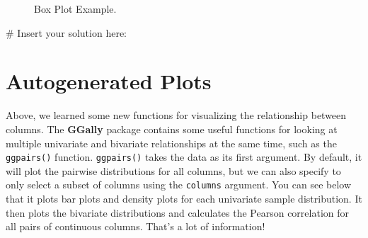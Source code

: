 \documentclass[
  letterpaper,
]{krantz}
\makeatletter
\newenvironment{Shaded}{\begin{snugshade}}{\end{snugshade}}
\newcommand{\CommentTok}[1]{\textcolor[rgb]{0.37,0.37,0.37}{#1}}
\newenvironment{kframe}{%
\medskip{}
\setlength{\fboxsep}{.8em}
 \def\at@end@of@kframe{}%
 \ifinner\ifhmode%
  \def\at@end@of@kframe{\end{minipage}}%
  \begin{minipage}{\columnwidth}%
 \fi\fi%
 \def\FrameCommand##1{\hskip\@totalleftmargin \hskip-\fboxsep
 \colorbox{shadecolor}{##1}\hskip-\fboxsep
     \hskip-\linewidth \hskip-\@totalleftmargin \hskip\columnwidth}%
 \MakeFramed {\advance\hsize-\width
   \@totalleftmargin\z@ \linewidth\hsize
   \@setminipage}}%
 {\par\unskip\endMakeFramed%
 \at@end@of@kframe}
\renewenvironment{Shaded}{\begin{kframe}}{\end{kframe}}
\makeatother
\begin{document}
\begin{figure}


\caption{\label{fig-box-plot}Box Plot Example.}

\end{figure}%

\begin{Shaded}
\begin{Highlighting}[]
\CommentTok{\# Insert your solution here:}
\end{Highlighting}
\end{Shaded}

\section{Autogenerated Plots}\label{autogenerated-plots}

Above, we learned some new functions for visualizing the relationship
between columns. The \textbf{GGally} package contains some useful
functions for looking at multiple univariate and bivariate relationships
at the same time, such as the \texttt{ggpairs()} function.
\texttt{ggpairs()} takes the data as its first argument. By default, it
will plot the pairwise distributions for all columns, but we can also
specify to only select a subset of columns using the \texttt{columns}
argument. You can see below that it plots bar plots and density plots
for each univariate sample distribution. It then plots the bivariate
distributions and calculates the Pearson correlation for all pairs of
continuous columns. That's a lot of information!
\end{document}
